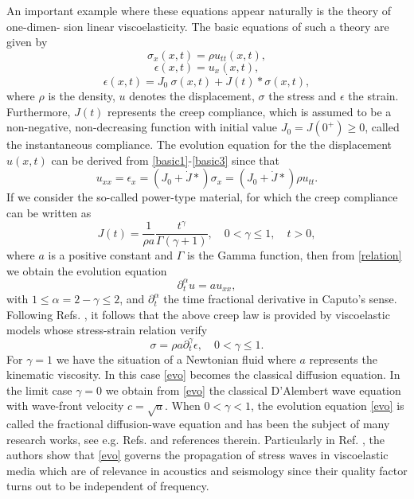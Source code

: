\documentclass[12pt,reqno]{amsart}
\begin{document}
			
An important example where these equations appear naturally is the theory of one-dimen- sion linear viscoelasticity. The basic equations of such a theory are given by			
\begin{equation}\label{basic1}
	\sigma_x(x,t)=\rho u_{tt}(x,t),
\end{equation}
\begin{equation}
	\epsilon(x,t)= u_{x}(x,t),
\end{equation}
\begin{equation}\label{basic3}
	\epsilon(x,t)= J_0\ \sigma(x,t) + \dot{J}(t)\ast \sigma(x,t),
\end{equation}
where $\rho$ is the density, $u$ denotes the displacement, $\sigma$ the stress and $\epsilon$ the strain. Furthermore, $J(t)$  represents the creep compliance, which is assumed to be a non-negative, non-decreasing function with initial value $J_0=J(0^+)\ge0$, called the instantaneous compliance. The evolution equation for the the displacement $u(x,t)$ can be derived from \eqref{basic1}-\eqref{basic3} since  that 
\begin{equation}\label{relation}
	u_{xx}=\epsilon_x=(J_0 + \dot{J}\ast)\sigma_x = (J_0 + \dot{J}\ast)\rho u_{tt}.
\end{equation}
If we consider the so-called power-type material, for which the creep compliance can be written as 
$$J(t)=\frac{1}{\rho a}\frac{t^\gamma}{\Gamma(\gamma+1)},\quad 0<\gamma\le 1,\quad t>0,$$
where $a$ is a positive constant and $\Gamma$ is the Gamma function, then from \eqref{relation} we obtain the evolution equation 
\begin{equation}\label{evo}
	\partial^{\alpha}_{t}u=a u_{xx},
\end{equation}
with $1\le \alpha=2-\gamma\le 2$, and $\partial^{\alpha}_{t}$ the time fractional derivative in Caputo's sense. Following Refs. \cite{CM,MT}, it follows that the above creep law is provided by viscoelastic models whose stress-strain relation verify
$$\sigma= \rho a \partial^{\gamma}_{t}\epsilon, \quad 0<\gamma\le 1.$$
For $\gamma=1$ we have the situation of a Newtonian fluid where $a$ represents the kinematic viscosity. In this case \eqref{evo} becomes the classical diffusion equation. In the limit case $\gamma=0$ we obtain from \eqref{evo} the classical D'Alembert wave equation with wave-front velocity $c=\sqrt{a}$. When $0<\gamma<1$, the evolution equation \eqref{evo} is called the fractional diffusion-wave equation and has been the subject of many research works, see e.g. Refs. \cite{ KKL, MK, MP} and references therein.  Particularly in Ref. \cite{MP}, the authors show that \eqref{evo} governs the propagation of stress waves in viscoelastic media which are of relevance in acoustics and seismology since their quality factor turns out to be independent of frequency. 			
			
\end{document}
